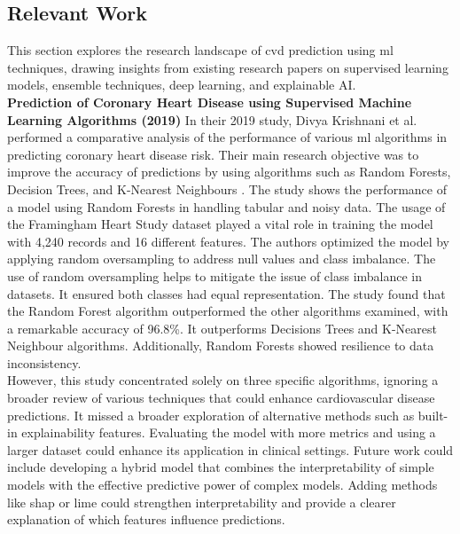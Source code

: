 \subsection{Relevant Work }
\label{sec:back_B}
This section explores the research landscape of \gls{cvd} prediction using \gls{ml} techniques, drawing insights from existing research papers on supervised learning models, ensemble techniques, deep learning, and explainable AI. \\

\noindent\textbf{Prediction of Coronary Heart Disease using Supervised Machine Learning Algorithms (2019) }
In their 2019 study, Divya Krishnani et al. performed a comparative analysis of the performance of various \gls{ml} algorithms in predicting coronary heart disease risk. Their main research objective was to improve the accuracy of predictions by using algorithms such as Random Forests, Decision Trees, and K-Nearest Neighbours \citep{krishnani2019prediction}. The study shows the performance of a model using Random Forests in handling tabular and noisy data. The usage of the Framingham Heart Study dataset played a vital role in training the model with 4,240 records and 16 different features. The authors optimized the model by applying random oversampling to address null values and class imbalance. The use of random oversampling helps to mitigate the issue of class imbalance in datasets. It ensured both classes had equal representation. The study found that the Random Forest algorithm outperformed the other algorithms examined, with a remarkable accuracy of 96.8\%. It outperforms Decisions Trees and K-Nearest Neighbour algorithms. Additionally, Random Forests showed resilience to data inconsistency. \\
However, this study concentrated solely on three specific algorithms, ignoring a broader review of various techniques that could enhance cardiovascular disease predictions. It missed a broader exploration of alternative methods such as built-in explainability features. Evaluating the model with more metrics and using a larger dataset could enhance its application in clinical settings.  Future work could include developing a hybrid model that combines the interpretability of simple models with the effective predictive power of complex models. Adding methods like \gls{shap} or \gls{lime} could strengthen interpretability and provide a clearer explanation of which features influence predictions. 
\vspace{0.5 cm}

